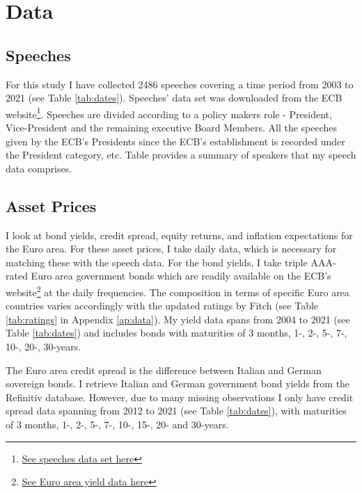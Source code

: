 \section{Data}
\subsection{Speeches}
For this study I have collected 2486 speeches covering a time period from 2003 to 2021 (see Table \ref{tab:dates}). Speeches' data set was downloaded from the ECB website\footnote{\href{https://www.ecb.europa.eu/press/key/date/html/index.en.html}{See speeches data set here}}. Speeches are divided according to a policy makers role - President, Vice-President and the remaining executive Board Members. All the speeches given by the ECB's Presidents since the ECB's establishment is recorded under the President category, etc. Table %
provides a summary of speakers that my speech data comprises.


%
\subsection{Asset Prices}
I look at bond yields, credit spread, equity returns, and inflation expectations for the Euro area. For these asset prices, I take daily data, which is necessary for matching these with the speech data. For the bond yields, I take triple AAA-rated Euro area government bonds which are readily available on the ECB’s website\footnote{\href{https://www.ecb.europa.eu/stats/financial_markets_and_interest_rates/euro_area_yield_curves/html/index.en.html}{See Euro area yield data here}} at the daily frequencies. The composition in terms of specific Euro area countries varies accordingly with the updated ratings by Fitch (see Table \ref{tab:ratings} in Appendix \ref{ap:data}). My yield data spans from 2004 to 2021 (see Table \ref{tab:dates}) and includes bonds with maturities of 3 months, 1-, 2-, 5-, 7-, 10-, 20-, 30-years.


The Euro area credit spread is the difference between Italian and German sovereign bonds. I retrieve Italian and German government bond yields from the Refinitiv database. However, due to many missing observations I only have credit spread data spanning from 2012 to 2021 (see Table \ref{tab:dates}), with maturities of 3 months, 1-, 2-, 5-, 7-, 10-, 15-, 20- and 30-years.



